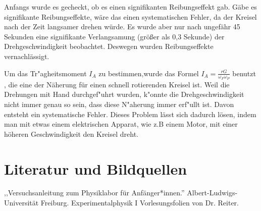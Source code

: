 \documentclass[11pt,a4paper]{article} %
\begin{document}
Anfangs wurde es gecheckt, ob es einen signifikanten Reibungseffekt gab. Gäbe es signifikante Reibungseffekte, wäre das einen systematischen Fehler, da der Kreisel nach der Zeit langsamer drehen würde. Es wurde aber nur nach ungefähr 45 Sekunden eine signifikante Verlangsamung (größer als 0,3 Sekunde) der Drehgeschwindigkeit beobachtet. Deswegen wurden Reibungseffekte vernachlässigt. 

Um das Tr"agheitsmoment $I_{A}$ zu bestimmen,wurde das Formel
$I_A = \frac{rG}{\omega_F \omega_P}$ benutzt , die eine der Näherung für einen schnell rotierenden Kreisel ist.
Weil die Drehungen mit Hand durchgef"uhrt wurden, k"onnte die Drehgeschwindigkeit nicht immer genau so sein, dass diese N"aherung immer erf"ullt ist. Davon entsteht ein systematische Fehler. Dieses Problem lässt sich dadurch lösen, indem man mit etwas einem elektrischen Apparat, wie z.B einem Motor, mit einer höheren Geschwindigkeit den Kreisel dreht.
\section{Literatur und Bildquellen}
,,Versuchsanleitung zum Physiklabor für Anfänger*innen.'' Albert-Ludwigs-Universität Freiburg. 
Experimentalphysik I Vorlesungsfolien von Dr. Reiter.
\end{document}
